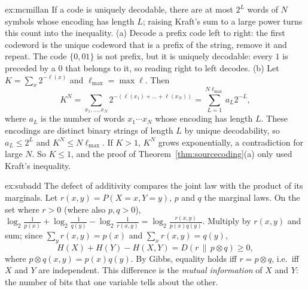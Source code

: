 \begin{solution}{ex:mcmillan}
\idea If a code is uniquely decodable, there are at most $2^L$ words of $N$ symbols whose encoding has length $L$; raising
Kraft's sum to a large power turns this count into the inequality.
\writeup (a) Decode a prefix code left to right: the first codeword is the unique codeword that is a prefix of the
string, remove it and repeat. The code $\{0,01\}$ is not prefix, but it is uniquely decodable: every $1$ is preceded by a $0$
that belongs to it, so reading right to left decodes. (b) Let $K=\sum_x2^{-\ell(x)}$ and $\ell_{\max}=\max\ell$. Then
\[
K^N=\sum_{x_1,\dots,x_N}2^{-(\ell(x_1)+\dots+\ell(x_N))}=\sum_{L=1}^{N\ell_{\max}}a_L2^{-L},
\]
where $a_L$ is the number of words $x_1\cdots x_N$ whose encoding has length $L$. These encodings are distinct binary strings of length
$L$ by unique decodability, so $a_L\le2^L$ and $K^N\le N\ell_{\max}$. If $K>1$, $K^N$ grows exponentially, a contradiction for large $N$. So
$K\le1$, and the proof of Theorem~\ref{thm:sourcecoding}(a) only used Kraft's inequality.
\end{solution}

\begin{solution}{ex:subadd}
\idea The defect of additivity compares the joint law with the product of its marginals.
\writeup Let $r(x,y)=P(X=x,Y=y)$, $p$ and $q$ the marginal laws. On the set where $r>0$ (where also $p,q>0$),
$\log_2\frac1{p(x)}+\log_2\frac1{q(y)}-\log_2\frac1{r(x,y)}=\log_2\frac{r(x,y)}{p(x)q(y)}$. Multiply by $r(x,y)$ and sum; since $\sum_yr(x,y)=p(x)$ and $\sum_xr(x,y)=q(y)$,
\[
H(X)+H(Y)-H(X,Y)=D(r\,\|\,p\otimes q)\ge0,
\]
where $p\otimes q(x,y)=p(x)q(y)$. By Gibbs, equality holds iff $r=p\otimes q$, i.e.\ iff $X$ and $Y$ are independent. This difference is the
\emph{mutual information} of $X$ and $Y$: the number of bits that one variable tells about the other.
\end{solution}

